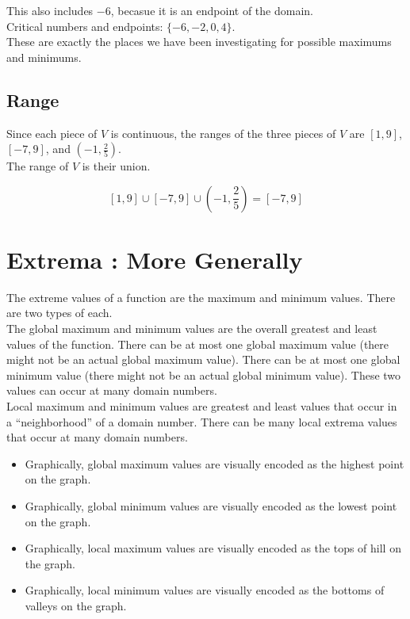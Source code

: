 \documentclass{ximera}
\begin{document}
This also includes $-6$, becasue it is an endpoint of the domain. \\



Critical numbers and endpoints: $\{ -6, -2, 0, 4 \}$. \\

These are exactly the places we have been investigating for possible maximums and minimums.






\subsection*{Range} 


Since each piece of $V$ is continuous, the ranges of the three pieces of $V$ are $[1, 9]$, $[-7, 9]$, and $\left( -1, \frac{2}{5} \right)$. \\

The range of $V$ is their union.

\[
[1, 9] \cup [-7, 9] \cup \left( -1, \frac{2}{5} \right) = [-7, 9]
\]













\section*{Extrema : More Generally}


The extreme values of a function are the maximum and minimum values.  There are two types of each. \\

The global maximum and minimum values are the overall greatest and least values of the function.  There can be at most one global maximum value (there might not be an actual global maximum value). There can be at most one global minimum value (there might not be an actual global minimum value).  These two values can occur at many domain numbers.\\


Local maximum and minimum values are greatest and least values that occur in a ``neighborhood'' of a domain number.  There can be many local extrema values that occur at many domain numbers. \\


\begin{itemize}
\item Graphically, global maximum values are visually encoded as the highest point on the graph.
\item Graphically, global minimum values are visually encoded as the lowest point on the graph.
\item Graphically, local maximum values are visually encoded as the tops of hill on the graph.
\item Graphically, local minimum values are visually encoded as the bottoms of valleys on the graph.
\end{itemize}
\end{document}
